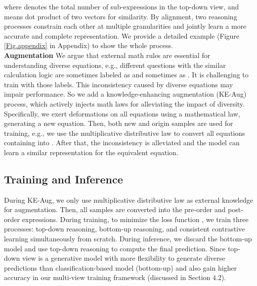 \documentclass[11pt]{article}
\begin{document}
where  denotes the total number of sub-expressions in the top-down view, and  means dot product of two vectors for similarity. By alignment, two reasoning processes constrain each other at multiple granularities and jointly learn a more accurate and complete representation. We provide a detailed example (Figure \ref{Fig.appendix} in Appendix) to show the whole process.\\
\indent \textbf{Augmentation}
We argue that external math rules are essential for understanding diverse equations, e.g., different questions with the similar calculation logic are sometimes labeled as  and sometimes as . It is challenging to train with those labels. This inconsistency caused by diverse equations may impair performance. So we add a knowledge-enhancing augmentation (KE-Aug) process, which actively injects math laws for alleviating the impact of diversity.
Specifically, we exert deformations on all equations using a mathematical law, generating a new equation. Then, both new and origin samples are used for training, e.g., we use the multiplicative distributive law to convert all equations containing  into . After that, the inconsistency is alleviated and the model can learn a similar representation for the equivalent equation.
\subsection{Training and Inference} 
During KE-Aug, we only use multiplicative distributive law as external knowledge for augmentation. Then, all samples are converted into the pre-order and post-order expressions. During training, to minimize the loss function , we train three processes: top-down reasoning, bottom-up reasoning, and consistent contrastive learning simultaneously from scratch. During inference, we discard the bottom-up model and use top-down reasoning to compute the final prediction. Since top-down view is a generative model with more flexibility to generate diverse predictions than classification-based model (bottom-up) and also gain higher accuracy in our multi-view training framework (discussed in Section 4.2). 
\end{document}

